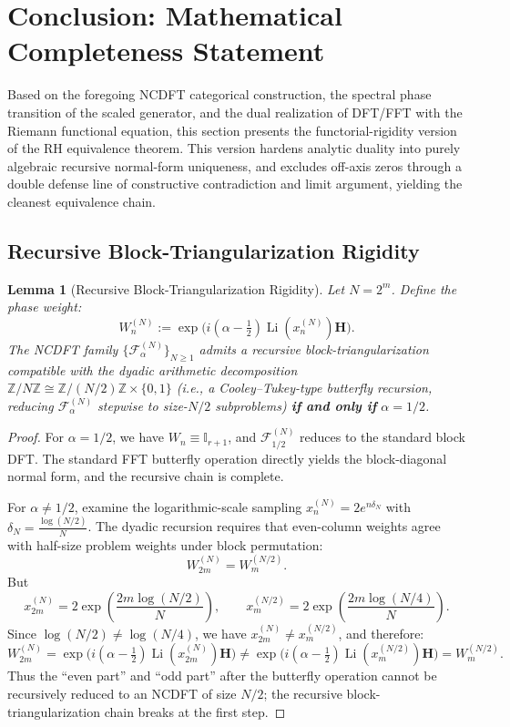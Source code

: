 \documentclass[12pt,a4paper]{amsart}
\theoremstyle{plain}
\newtheorem{lemma}[theorem]{Lemma}
\theoremstyle{definition}
\theoremstyle{remark}
\begin{document}
\section{Conclusion: Mathematical Completeness Statement}

Based on the foregoing NCDFT categorical construction, the spectral phase transition of the scaled generator, and the dual realization of DFT/FFT with the Riemann functional equation, this section presents the functorial-rigidity version of the RH equivalence theorem. This version hardens analytic duality into purely algebraic recursive normal-form uniqueness, and excludes off-axis zeros through a double defense line of constructive contradiction and limit argument, yielding the cleanest equivalence chain.

\subsection{Recursive Block-Triangularization Rigidity}

\begin{lemma}[Recursive Block-Triangularization Rigidity]\label{lem:rigid}
Let $N=2^m$. Define the phase weight:
\[
W_n^{(N)} := \exp\!\big(i(\alpha-\tfrac12)\operatorname{Li}(x_n^{(N)})\mathbf{H}\big).
\]
The NCDFT family $\{\mathcal{F}_\alpha^{(N)}\}_{N\geq 1}$ admits a recursive block-triangularization compatible with the dyadic arithmetic decomposition $\mathbb{Z}/N\mathbb{Z} \cong \mathbb{Z}/(N/2)\mathbb{Z} \times \{0,1\}$ (i.e., a Cooley--Tukey-type butterfly recursion, reducing $\mathcal{F}_\alpha^{(N)}$ stepwise to size-$N/2$ subproblems) \textbf{if and only if} $\alpha=1/2$.
\end{lemma}

\begin{proof}
For $\alpha=1/2$, we have $W_n\equiv\mathbb{I}_{r+1}$, and $\mathcal{F}_{1/2}^{(N)}$ reduces to the standard block DFT. The standard FFT butterfly operation directly yields the block-diagonal normal form, and the recursive chain is complete.

For $\alpha\neq 1/2$, examine the logarithmic-scale sampling $x_n^{(N)}=2e^{n\delta_N}$ with $\delta_N=\frac{\log(N/2)}{N}$. The dyadic recursion requires that even-column weights agree with half-size problem weights under block permutation:
\[
W_{2m}^{(N)} = W_m^{(N/2)}.
\]
But
\[
x_{2m}^{(N)} = 2\exp\!\left(\frac{2m\log(N/2)}{N}\right),\qquad 
x_m^{(N/2)} = 2\exp\!\left(\frac{2m\log(N/4)}{N}\right).
\]
Since $\log(N/2)\neq\log(N/4)$, we have $x_{2m}^{(N)}\neq x_m^{(N/2)}$, and therefore:
\[
W_{2m}^{(N)} = \exp\!\big(i(\alpha-\tfrac12)\operatorname{Li}(x_{2m}^{(N)})\mathbf{H}\big) \neq 
\exp\!\big(i(\alpha-\tfrac12)\operatorname{Li}(x_m^{(N/2)})\mathbf{H}\big) = W_m^{(N/2)}.
\]
Thus the ``even part'' and ``odd part'' after the butterfly operation cannot be recursively reduced to an NCDFT of size $N/2$; the recursive block-triangularization chain breaks at the first step.
\end{proof}
\end{document}
